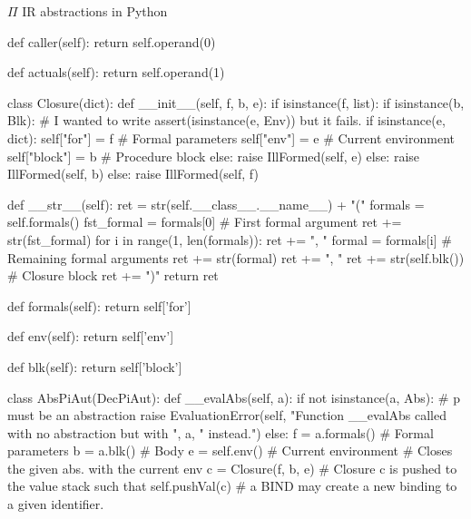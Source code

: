 \documentclass{beamer}
\begin{document}
\begin{frame}{{\color{red}$\Pi$ IR} abstractions in Python}
\begin{python}
    def caller(self):
        return self.operand(0)

    def actuals(self):
        return self.operand(1)

class Closure(dict):
    def __init__(self, f, b, e):
        if isinstance(f, list):
            if isinstance(b, Blk):
                # I wanted to write assert(isinstance(e, Env)) but it fails.
                if isinstance(e, dict):
                    self["for"] = f             # Formal parameters
                    self["env"] = e             # Current environment
                    self["block"] = b           # Procedure block
                else:
                    raise IllFormed(self, e)
            else:
                raise IllFormed(self, b)
        else:
            raise IllFormed(self, f)

    def __str__(self):
        ret = str(self.__class__.__name__) + "("
        formals = self.formals()
        fst_formal = formals[0]     # First formal argument
        ret += str(fst_formal)
        for i in range(1, len(formals)):
            ret += ", "
            formal = formals[i]     # Remaining formal arguments
            ret += str(formal)
        ret += ", "
        ret += str(self.blk())      # Closure block
        ret += ")"
        return ret

    def formals(self):
        return self['for']

    def env(self):
        return self['env']

    def blk(self):
        return self['block']

class AbsPiAut(DecPiAut):
    def __evalAbs(self, a):
        if not isinstance(a, Abs):  # p must be an abstraction
            raise EvaluationError(self, "Function __evalAbs called with no abstraction but with ", a, " instead.")
        else:
            f = a.formals()             # Formal parameters
            b = a.blk()                 # Body
            e = self.env()              # Current environment
            # Closes the given abs. with the current env
            c = Closure(f, b, e)
            # Closure c is pushed to the value stack such that
            self.pushVal(c)
            # a BIND may create a new binding to a given identifier.


\end{python}
\end{frame}
\end{document}
